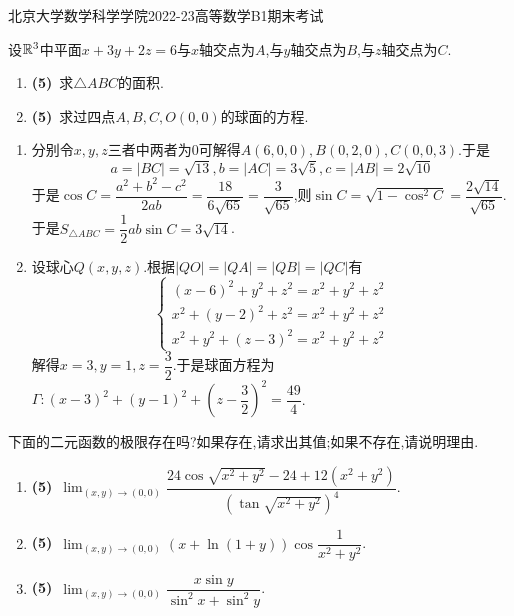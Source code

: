 \documentclass{ctexart}
\begin{document}
\pagestyle{empty}
\begin{center}\Large
    北京大学数学科学学院2022-23高等数学B1期末考试
\end{center}
\begin{problem}[1.(10\songti{分})]
    设$\mathbb{R}^3$中平面$x+3y+2z=6$与$x$轴交点为$A$,与$y$轴交点为$B$,与$z$轴交点为$C$.
    \begin{enumerate}[label=\textbf{(\arabic*)},leftmargin=*]
        \item \textbf{(5)}\ 求$\triangle ABC$的面积.
        \item \textbf{(5)}\ 求过四点$A,B,C,O(0,0)$的球面的方程.
    \end{enumerate}
\end{problem}
\begin{solution}[Solution.]
    \begin{enumerate}[label=\textbf{(\arabic*)},leftmargin=*]
        \item 分别令$x,y,z$三者中两者为$0$可解得$A(6,0,0),B(0,2,0),C(0,0,3)$.于是
            $$a=|BC|=\sqrt{13},b=|AC|=3\sqrt{5},c=|AB|=2\sqrt{10}$$
            于是$\cos C=\dfrac{a^2+b^2-c^2}{2ab}=\dfrac{18}{6\sqrt{65}}=\dfrac{3}{\sqrt{65}}$,则$\sin C=\sqrt{1-\cos^2C}=\dfrac{2\sqrt{14}}{\sqrt{65}}$.\\
            于是$S_{\triangle ABC}=\dfrac{1}{2}ab\sin C=3\sqrt{14}$.
        \item 设球心$Q(x,y,z)$.根据$|QO|=|QA|=|QB|=|QC|$有
            $$\left\{\begin{array}{l}
                (x-6)^2+y^2+z^2=x^2+y^2+z^2\\
                x^2+(y-2)^2+z^2=x^2+y^2+z^2\\
                x^2+y^2+(z-3)^2=x^2+y^2+z^2
            \end{array}\right.$$
            解得$x=3,y=1,z=\dfrac{3}{2}$.于是球面方程为$\Gamma:(x-3)^2+(y-1)^2+\left(z-\dfrac{3}{2}\right)^2=\dfrac{49}{4}$.
    \end{enumerate}
\end{solution}
\begin{problem}[2.(15\songti{分})]
    下面的二元函数的极限存在吗?如果存在,请求出其值;如果不存在,请说明理由.
        \begin{enumerate}[label=\textbf{(\arabic*)},leftmargin=*]
            \item \textbf{(5)}\ $\displaystyle\lim_{(x,y)\to(0,0)}\dfrac{24\cos\sqrt{x^2+y^2}-24+12\left(x^2+y^2\right)}{\left(\tan\sqrt{x^2+y^2}\right)^4}$.
            \item \textbf{(5)}\ $\displaystyle\lim_{(x,y)\to(0,0)}\left(x+\ln(1+y)\right)\cos\dfrac{1}{x^2+y^2}$.
            \item \textbf{(5)}\ $\displaystyle\lim_{(x,y)\to(0,0)}\dfrac{x\sin y}{\sin^2x+\sin^2y}$.
        \end{enumerate}
\end{problem}
\end{document}
